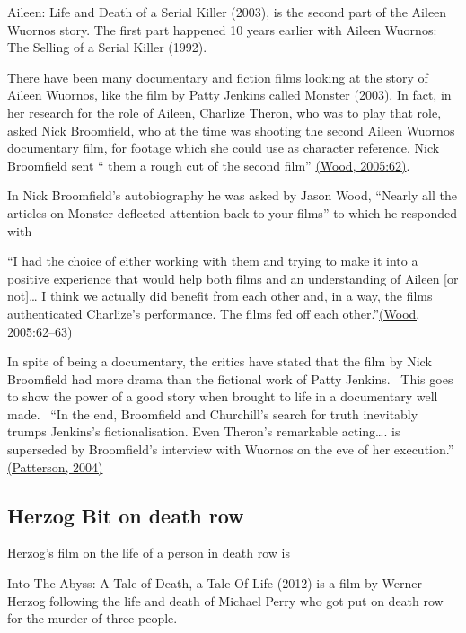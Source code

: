 \documentclass[
]{book}
\begin{document}
Aileen: Life and Death of a Serial Killer (2003), is the second part of the Aileen Wuornos story. The first part happened 10 years earlier with Aileen Wuornos: The Selling of a Serial Killer (1992).

There have been many documentary and fiction films looking at the story of Aileen Wuornos, like the film by Patty Jenkins called Monster (2003). In fact, in her research for the role of Aileen, Charlize Theron, who was to play that role, asked Nick Broomfield, who at the time was shooting the second Aileen Wuornos documentary film, for footage which she could use as character reference. Nick Broomfield sent `` them a rough cut of the second film'' \href{https://paperpile.com/c/SdLVV0/QZbN/?locator=62}{(Wood, 2005:62)}.~

In Nick Broomfield's autobiography he was asked by Jason Wood, ``Nearly all the articles on Monster deflected attention back to your films'' to which he responded with~

``I had the choice of either working with them and trying to make it into a positive experience that would help both films and an understanding of Aileen {[}or not{]}\ldots{} I think we actually did benefit from each other and, in a way, the films authenticated Charlize's performance. The films fed off each other.''\href{https://paperpile.com/c/SdLVV0/QZbN/?locator=62-63}{(Wood, 2005:62--63)}

In spite of being a documentary, the critics have stated that the film by Nick Broomfield had more drama than the fictional work of Patty Jenkins.~ This goes to show the power of a good story when brought to life in a documentary well made.~ ``In the end, Broomfield and Churchill's search for truth inevitably trumps Jenkins's fictionalisation. Even Theron's remarkable acting\ldots. is superseded by Broomfield's interview with Wuornos on the eve of her execution.'' \href{https://paperpile.com/c/SdLVV0/veXD}{(Patterson, 2004)}

\hypertarget{herzog-bit-on-death-row}{%
\subsection{Herzog Bit on death row}\label{herzog-bit-on-death-row}}

Herzog's film on the life of a person in death row is~

Into The Abyss: A Tale of Death, a Tale Of Life (2012) is a film by Werner Herzog following the life and death of Michael Perry who got put on death row for the murder of three people.
\end{document}
